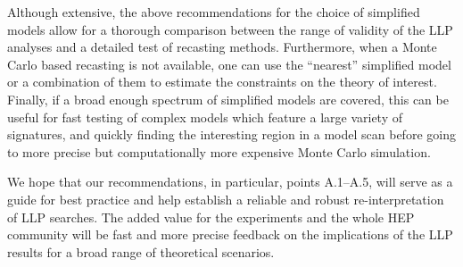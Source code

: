 \noindent
Although extensive, the above recommendations for the choice of simplified
models allow for a thorough comparison between the range of validity of
the LLP analyses and a detailed test of recasting methods.
Furthermore, when a Monte Carlo based recasting is not available, one
can use the ``nearest'' simplified model or a combination of them to
estimate the constraints on the theory of interest.
Finally, if a broad enough spectrum of simplified models are covered, this can
be useful for fast testing of complex models which feature a large variety of signatures,
and quickly finding the interesting region in a model scan before going to more precise but
computationally more expensive Monte Carlo simulation.

We hope that our recommendations, in particular, points A.1--A.5, will serve as a guide for best practice and help establish a reliable and robust re-interpretation of LLP searches.
The added value for the experiments and the whole HEP community will be fast and more precise feedback on the implications of the LLP results for a broad range of theoretical scenarios.


%
%
%
%
